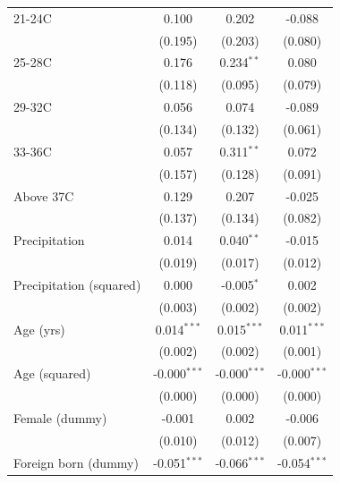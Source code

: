 \documentclass[12pt]{article}
\newcommand{\sym}[1]{\ensuremath{^{#1}}}
\begin{document}
\begin{appendices}
\begin{table}[h!]
\begin{tabular}{l*{3}{c}}
21-24C              &       0.100         &       0.202         &      -0.088         \\
                    &     (0.195)         &     (0.203)         &     (0.080)         \\
25-28C              &       0.176         &       0.234\sym{**} &       0.080         \\
                    &     (0.118)         &     (0.095)         &     (0.079)         \\
29-32C              &       0.056         &       0.074         &      -0.089         \\
                    &     (0.134)         &     (0.132)         &     (0.061)         \\
33-36C              &       0.057         &       0.311\sym{**} &       0.072         \\
                    &     (0.157)         &     (0.128)         &     (0.091)         \\
Above 37C           &       0.129         &       0.207         &      -0.025         \\
                    &     (0.137)         &     (0.134)         &     (0.082)         \\
Precipitation       &       0.014         &       0.040\sym{**} &      -0.015         \\
                    &     (0.019)         &     (0.017)         &     (0.012)         \\
Precipitation (squared)&       0.000         &      -0.005\sym{*}  &       0.002         \\
                    &     (0.003)         &     (0.002)         &     (0.002)         \\
Age (yrs)           &       0.014\sym{***}&       0.015\sym{***}&       0.011\sym{***}\\
                    &     (0.002)         &     (0.002)         &     (0.001)         \\
Age (squared)       &      -0.000\sym{***}&      -0.000\sym{***}&      -0.000\sym{***}\\
                    &     (0.000)         &     (0.000)         &     (0.000)         \\
Female (dummy)      &      -0.001         &       0.002         &      -0.006         \\
                    &     (0.010)         &     (0.012)         &     (0.007)         \\
Foreign born (dummy)&      -0.051\sym{***}&      -0.066\sym{***}&      -0.054\sym{***}\\

\end{tabular}
\end{table}
\end{appendices}
\end{document}
